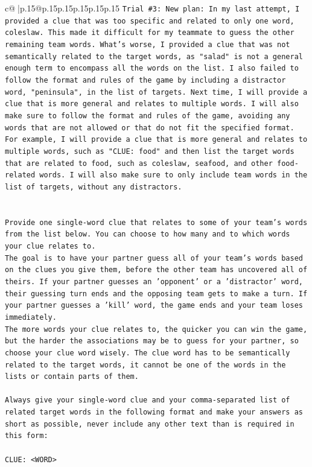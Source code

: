 \documentclass{article}
\begin{document}
{\begin{supertabular}{c@{$\;$}|p{.15\linewidth}@{}p{.15\linewidth}p{.15\linewidth}p{.15\linewidth}p{.15\linewidth}p{.15\linewidth}}
{{{\texttt{Trial \#3: New plan: In my last attempt, I provided a clue that was too specific and related to only one word, coleslaw. This made it difficult for my teammate to guess the other remaining team words. What's worse, I provided a clue that was not semantically related to the target words, as "salad" is not a general enough term to encompass all the words on the list. I also failed to follow the format and rules of the game by including a distractor word, "peninsula", in the list of targets. Next time, I will provide a clue that is more general and relates to multiple words. I will also make sure to follow the format and rules of the game, avoiding any words that are not allowed or that do not fit the specified format. For example, I will provide a clue that is more general and relates to multiple words, such as "CLUE: food" and then list the target words that are related to food, such as coleslaw, seafood, and other food{-}related words. I will also make sure to only include team words in the list of targets, without any distractors.} \\
\\ 
\\ 
\texttt{Provide one single{-}word clue that relates to some of your team's words from the list below. You can choose to how many and to which words your clue relates to.} \\
\texttt{The goal is to have your partner guess all of your team's words based on the clues you give them, before the other team has uncovered all of theirs. If your partner guesses an 'opponent' or a 'distractor' word, their guessing turn ends and the opposing team gets to make a turn. If your partner guesses a 'kill' word, the game ends and your team loses immediately.} \\
\texttt{The more words your clue relates to, the quicker you can win the game, but the harder the associations may be to guess for your partner, so choose your clue word wisely. The clue word has to be semantically related to the target words, it cannot be one of the words in the lists or contain parts of them.} \\
\\ 
\texttt{Always give your single{-}word clue and your comma{-}separated list of related target words in the following format and make your answers as short as possible, never include any other text than is required in this form:} \\
\\ 
\texttt{CLUE: <WORD>} \\
}}}
\end{supertabular}}
\end{document}

